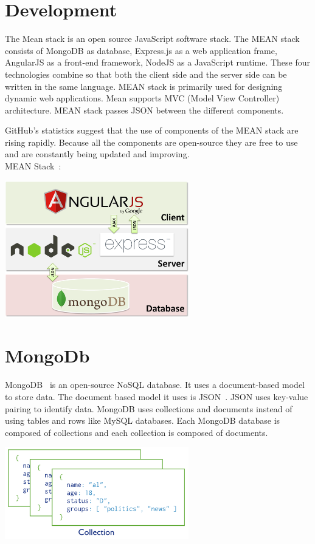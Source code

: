 \section{Development}
The Mean stack is an open source JavaScript software stack. The MEAN stack consists of MongoDB as database, Express.js as a web application frame, AngularJS as a front-end framework, NodeJS as a JavaScript runtime. These four technologies combine so that both the client side and the server side can be written in the same language. MEAN stack is primarily used for designing dynamic web applications. Mean supports MVC (Model View Controller) architecture. MEAN stack passes JSON between the different components.

GitHub’s statistics suggest that the use of components of the MEAN stack are rising rapidly. Because all the components are open-source they are free to use and are constantly being updated and improving. \\

MEAN Stack~\cite{MEANphoto}:
    \begin{center}    
      \includegraphics[width=80mm]{img/MEAN.png}
    \end{center}

\section{MongoDb}
MongoDB~\cite{mongoDB} is an open-source NoSQL database. It uses a document-based model to store data. The document based model it uses is JSON~\cite{JsonBson}. JSON uses key-value pairing to identify data. MongoDB uses collections and documents instead of using tables and rows like MySQL databases. Each MongoDB database is composed of collections and each collection is composed of documents. \\

\begin{center}    
    \includegraphics[width=80mm]{img/Collection.png}
\end{center}



